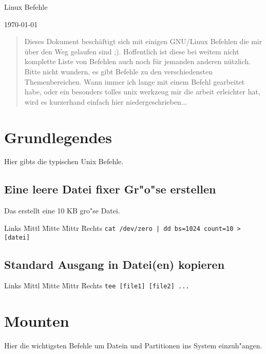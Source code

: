 \documentclass[12pt]{article}
\newenvironment{code}{\begin{tabbing}Links \= Mittl \= Mitte \= Mittr \= Rechts \kill}{\end{tabbing}}
\begin{document}
\pagestyle{empty}

\label{cover_page}

\begin{center}
	\huge{Linux Befehle\\}
\end{center}

\begin{center}
	\today
\end{center}

\begin{abstract}
	\label{the_abstract}
	Dieses Dokument beschäftigt sich mit einigen GNU/Linux Befehlen die
	mir über den Weg gelaufen sind ;). Hoffentlich ist diese bei weitem nicht 
	komplette Liste von Befehlen auch noch für jemanden anderen nützlich.
	Bitte nicht wundern, es gibt Befehle zu den verschiedensten Themenbereichen. Wann immer
	ich lange mit einem Befehl gearbeitet habe, oder ein besonders tolles unix werkzeug mir
	die arbeit erleichter hat, wird es kurzerhand einfach hier niedergeschrieben...
\end{abstract}
\newpage

\tableofcontents

\newpage
\section{Grundlegendes}
Hier gibts die typischen Unix Befehle.
\subsection{Eine leere Datei fixer Gr"o"se erstellen}
Das erstellt eine 10 KB gro"se Datei.
\begin{code}
	\> \verb#cat /dev/zero | dd bs=1024 count=10 > [datei]#
\end{code}
\subsection{Standard Ausgang in Datei(en) kopieren}
\begin{code}
	\> \verb#tee [file1] [file2] ...#
\end{code}

\section{Mounten}
Hier die wichtigsten Befehle um Datein und Partitionen ins System einzuh"angen.
\end{document}
